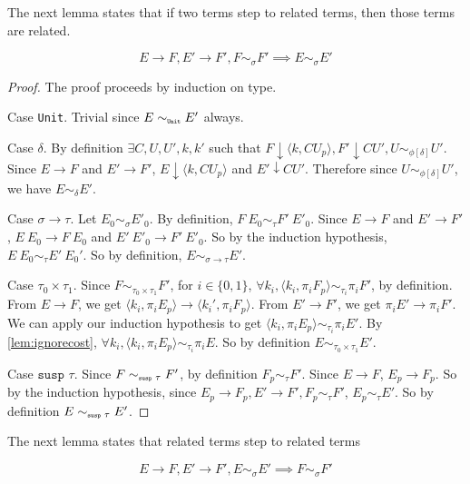 The next lemma states that if two terms step to related terms, then those terms are related.
\begin{lemma}
  \label{lem:relatedstepback}
  \[
    E \to F, E' \to F', F \sim_\sigma F' \implies E \sim_\sigma E'
  \]
\end{lemma}
\begin{proof}
  The proof proceeds by induction on type.
  
  Case \texttt{Unit}. Trivial since $E \sim_{\texttt{\tiny{Unit}}} E'$ always.

  Case $\delta$.
  By definition $\exists C, U, U', k, k'$ such that $F \downarrow \langle k, C U_p \rangle, F' \downarrow C U', U \sim_{\phi[\delta]} U'$.
  Since $E \to F$ and $E' \to F'$, $E \downarrow \langle k, C U_p \rangle$ and $E' \downarrow C U'$.
  Therefore since $U \sim_{\phi[\delta]} U'$, we have $E \sim_\delta E'$.

  Case $\sigma \to \tau$.
  Let $E_0 \sim_\sigma E'_0$.
  By definition, $F\ E_0 \sim_\tau F'\ E'_0$.
  Since $E \to F$ and $E' \to F'$, $E\ E_0 \to F\ E_0$ and $E'\ E'_0 \to F'\ E'_0$.
  So by the induction hypothesis, $E\ E_0 \sim_\tau E'\ E_0'$.
  So by definition, $E \sim_{\sigma \to \tau} E'$.

  Case $\tau_0 \times \tau_1$.
  Since $F \sim_{\tau_0 \times \tau_1} F'$, for $i\in\{0, 1\}$,  $\forall k_i, \langle k_i, \pi_i F_p \rangle \sim_{\tau_i} \pi_i F'$, by definition.
  From $E \to F$, we get $\langle k_i, \pi_i E_p \rangle \to \langle k_i', \pi_i F_p \rangle$.
  From $E' \to F'$, we get $\pi_i E' \to \pi_i F'$.
  We can apply our induction hypothesis to get $\langle k_i, \pi_i E_p \rangle \sim_{\tau_i} \pi_i E'$.
  By \ref{lem:ignorecost}, $\forall k_i, \langle k_i, \pi_i E_p \rangle \sim_{\tau_i} \pi_i E$.
  So by definition $E \sim_{\tau_0 \times \tau_1} E'$.

  Case $\texttt{susp }\tau$.
  Since $F \sim_{\texttt{\tiny{susp }}\tau} F'$, by definition $F_p \sim_\tau F'$.
  Since $E \to F$, $E_p \to F_p$.
  So by the induction hypothesis, since $E_p \to F_p, E' \to F', F_p \sim_\tau F'$, $E_p \sim_\tau E'$.
  So by definition $E \sim_{\texttt{\tiny{susp }}\tau} E'$.

\end{proof}

The next lemma states that related terms step to related terms

\begin{lemma}
  \label{lem:relatedstep}
  \[ E \to F, E' \to F', E \sim_\sigma E' \implies F \sim_\sigma F' \]
\end{lemma}

